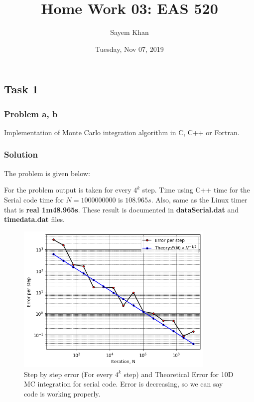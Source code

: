\documentclass{article}
\title{Home Work 03: EAS 520}
\author{Sayem Khan}
\date{Tuesday, Nov 07, 2019}
\begin{document}
\maketitle
\subsection*{Task 1}
\subsubsection*{Problem a, b} 
Implementation of Monte Carlo integration algorithm in C, C++ or Fortran.
\subsubsection*{Solution}
The problem is given below:



For the problem output is taken for every $4^k$ step. Time using C++ time for the Serial code time for $N = 1000000000$ is $108.965s$. Also, same as the Linux timer that is \textbf{real 1m48.965s}. These result is documented in \textbf{dataSerial.dat} and \textbf{timedata.dat} files.



\begin{figure}[h!]
  \centering
    \includegraphics[width=0.85\textwidth]{step_by_step_error}
    \caption{Step by step error (For every $4^k$ step) and Theoretical Error for 10D MC integration for serial code. Error is decreasing, so we can say code is working properly.} 
    \label{t1a}
\end{figure}
\end{document}
